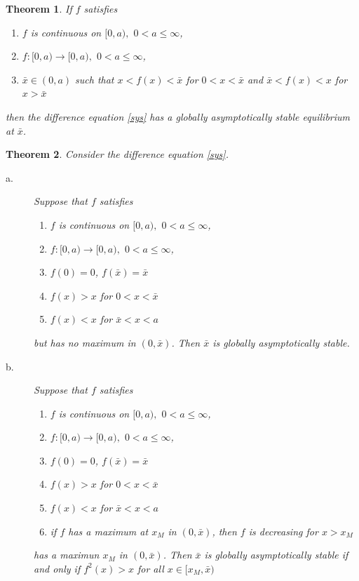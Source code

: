 \documentclass[12pt]{article}
\theoremstyle{plain}
\newtheorem{theorem}{Theorem}[section]
\begin{document}
\begin{theorem}\label{th:gas_3}
If $f$ satisfies
\begin{enumerate}
\item $f$ is continuous on $[0,a),$ $0<a\leq \infty$,
\item $f: [0,a)\rightarrow [0,a),$ $0<a\leq \infty$,
\item $\bar x \in (0,a)$ such that $x<f(x)<\bar x$ for $0<x<\bar x$
and $\bar x<f(x)< x$ for $x>\bar x$
\end{enumerate}
then the difference equation \eqref{sys} has a globally asymptotically stable equilibrium at $\bar x$.
\end{theorem}

\begin{theorem}\label{th:gas_4}
Consider the difference equation \eqref{sys}.
\begin{description}
\item[a.]Suppose that $f$ satisfies
\begin{enumerate}
\item $f$ is continuous on $[0,a),$ $0<a\leq \infty$,
\item $f: [0,a)\rightarrow [0,a),$ $0<a\leq \infty$,
\item $f(0)=0$, $f(\bar x)=\bar x$ 
\item $f(x)>x$ for $0<x<\bar x$
\item $f(x)<x$ for $\bar x<x<a$
\end{enumerate}
but has no maximum in $(0,\bar x)$. Then $\bar x$ is globally asymptotically stable.
\item[b.]Suppose that $f$ satisfies
\begin{enumerate}
\item $f$ is continuous on $[0,a),$ $0<a\leq \infty$,
\item $f: [0,a)\rightarrow [0,a),$ $0<a\leq \infty$,
\item $f(0)=0$, $f(\bar x)=\bar x$ 
\item $f(x)>x$ for $0<x<\bar x$
\item $f(x)<x$ for $\bar x<x<a$
\item if $f$ has a maximum at $x_M$ in $(0,\bar x)$, then $f$ is decreasing for $x>x_M$
\end{enumerate}
has a maximun $x_M$ in $(0,\bar x)$. Then $\bar x$ is globally asymptotically stable if and only if $f^2(x)>x$ for all $x\in [x_M,\bar x)$
\end{description}
\end{theorem}
\end{document}
